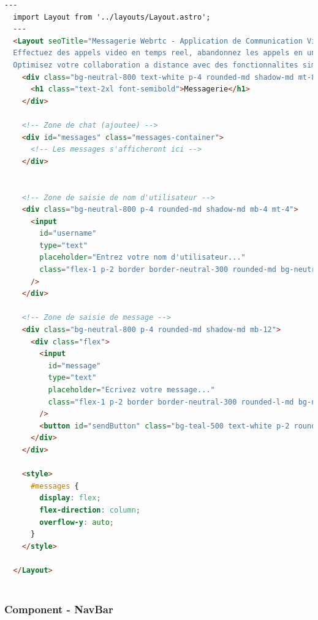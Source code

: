 \documentclass[12pt, a4paper, oneside]{thesis}
\begin{document}
\begin{lstlisting}[language=HTML, caption={Page - Messagerie}, label=Page - Messagerie]
  ---
  import Layout from '../layouts/Layout.astro';
  ---
  <Layout seoTitle="Messagerie Webrtc - Application de Communication Video en Temps Reel" seoDesc="Facilitez vos reunions professionnelles avec notre application de projet Webrtc. 
  Effectuez des appels video en temps reel, abandonnez les appels en un clic, et gerez facilement le son et la camera. 
  Optimisez votre collaboration a distance avec des fonctionnalites simples et efficaces.">
    <div class="bg-neutral-800 text-white p-4 rounded-md shadow-md mt-8">
      <h1 class="text-2xl font-semibold">Messagerie</h1>
    </div>
  
    <!-- Zone de chat (ajoutee) -->
    <div id="messages" class="messages-container">
      <!-- Les messages s'afficheront ici -->
    </div>
  
  
    <!-- Zone de saisie de nom d'utilisateur -->
    <div class="bg-neutral-800 p-4 rounded-md shadow-md mb-4 mt-4">
      <input
        id="username"
        type="text"
        placeholder="Entrez votre nom d'utilisateur..."
        class="flex-1 p-2 border border-neutral-300 rounded-md bg-neutral-800"
      />
    </div>
  
    <!-- Zone de saisie de message -->
    <div class="bg-neutral-800 p-4 rounded-md shadow-md mb-12">
      <div class="flex">
        <input
          id="message"
          type="text"
          placeholder="Ecrivez votre message..."
          class="flex-1 p-2 border border-neutral-300 rounded-l-md bg-neutral-800"
        />
        <button id="sendButton" class="bg-teal-500 text-white p-2 rounded-r-md">Envoyer</button>
      </div>
    </div>
  
    <style>
      #messages {
        display: flex;
        flex-direction: column;
        overflow-y: auto;
      }
    </style>

  </Layout>
  
\end{lstlisting}


\newpage
\subsubsection{Component - NavBar}
\end{document}
